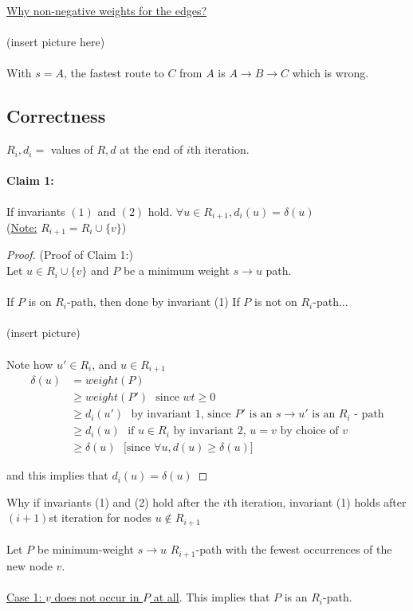 \documentclass[12pt]{article}
\begin{document}
\underline{Why non-negative weights for the edges?}\\
\\
(insert picture here)
\\
\\
With $s = A$, the fastest route to $C$ from $A$ is $A \rightarrow B \rightarrow C$ which is wrong.

\subsection{Correctness}

$R_i, d_i = $ values of $R,d$ at the end of $i$th iteration.

\paragraph{Claim 1:} If invariants $(1)$ and $(2)$ hold. $\forall u \in R_{i+1}, d_i (u) = \delta (u)$\\
(\underline{Note:} $R_{i+1} = R_i \cup \{ v \}$)

\begin{proof}
	(Proof of Claim 1:)\\
	Let $u \in R_i \cup \{ v \}$ and $P$ be a minimum weight $s \rightarrow u$ path.\\
	\\
	If $P$ is on $R_i$-path, then done by invariant (1)
	If $P$ is not on $R_i$-path...\\
	\\
	(insert picture)
	\\
	\\
	Note how $u' \in R_i$, and $u \in R_{i+1}$
	\begin{align*}
		\delta (u) &= weight(P)\\
		&\geq weight(P') \:\:\:\text{since $wt \geq 0$}\\
		&\geq d_i (u') \:\:\:\text{by invariant 1, since $P'$ is an $s \rightarrow u'$ is an $R_i$ - path}\\
		&\geq d_i (u) \:\:\:\text{if $u\in R_i$ by invariant 2, $u=v$ by choice of $v$}\\
		&\geq \delta (u) \:\:\:\text{[since $\forall u, d(u) \geq \delta (u)$]}
	\end{align*}
	
	and this implies that $d_i (u) = \delta (u)$

\end{proof}

Why if invariants (1) and (2) hold after the $i$th iteration, invariant (1) holds after $(i+1)$st iteration for nodes $u \not\in R_{i+1}$\\
\\
Let $P$ be minimum-weight $s\rightarrow u$ $R_{i+1}$-path with the fewest occurrences of the new node $v$.\\
\\
\underline{Case 1: $v$ does not occur in $P$ at all}. This implies that $P$ is an $R_i$-path.
\end{document}
